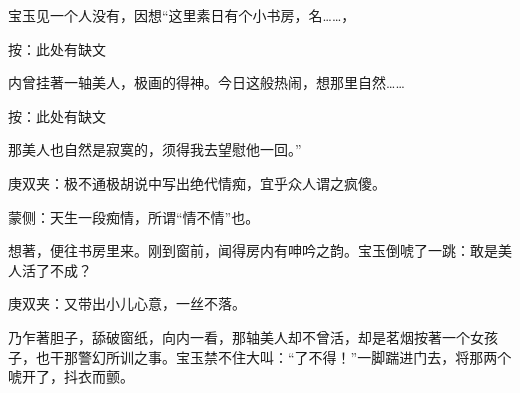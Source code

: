 \begin{parag}
    宝玉见一个人没有，因想“这里素日有个小书房，名……，\begin{subnote}按：此处有缺文\end{subnote}内曾挂著一轴美人，极画的得神。今日这般热闹，想那里自然……\begin{subnote}按：此处有缺文\end{subnote}那美人也自然是寂寞的，须得我去望慰他一回。”\begin{note}庚双夹：极不通极胡说中写出绝代情痴，宜乎众人谓之疯傻。\end{note}\begin{note}蒙侧：天生一段痴情，所谓“情不情”也。\end{note}想著，便往书房里来。刚到窗前，闻得房内有呻吟之韵。宝玉倒唬了一跳：敢是美人活了不成？\begin{note}庚双夹：又带出小儿心意，一丝不落。\end{note}乃乍著胆子，舔破窗纸，向内一看，那轴美人却不曾活，却是茗烟按著一个女孩子，也干那警幻所训之事。宝玉禁不住大叫：“了不得！”一脚踹进门去，将那两个唬开了，抖衣而颤。
\end{parag}



